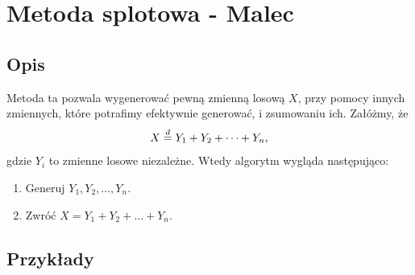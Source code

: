 \documentclass[12pt]{mwrep}
\begin{document}
%









	
	\section{Metoda splotowa - Malec}
	
	\subsection{Opis}
	\noindent Metoda ta pozwala wygenerować pewną zmienną losową $X$, przy pomocy innych zmiennych, które potrafimy efektywnie generować, i zsumowaniu ich. Załóżmy, że
	$$ X \buildrel{d} \over{=} Y_1 + Y_2 + \dots + Y_n, $$
	gdzie $Y_i$ to zmienne losowe niezależne. Wtedy algorytm wygląda następująco:
	\begin{enumerate}[leftmargin=10mm]
		\item Generuj $ Y_1, Y_2, \dots, Y_n $.
		\item Zwróć $ X = Y_1 + Y_2 + \dots + Y_n $.
	\end{enumerate}

	\subsection{Przykłady}
	
\end{document}
